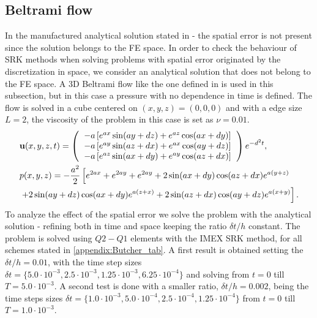 \subsection{Beltrami flow}
In the manufactured analytical solution stated in - the spatial error is not present since the solution belongs to the FE space. In order to check the behaviour of SRK methods when solving problems with spatial error originated by the discretization in space, we consider an analytical solution that does not belong to the FE space. A 3D Beltrami flow like the one defined in \cite{ethier_exact_1994} is used in this subsection, but in this case a pressure with no dependence in time is defined. The flow is solved in a cube centered on $(x,y,z)=(0,0,0)$ and with a edge size $L=2$, the viscosity of the problem in this case is set as $\nu=0.01$.
\begin{align}
\label{eq-C6_beltrami_u}
&\u(x,y,z,t) = \left( \begin{tabular}{l}
$-a\left[e^{ax}\sin(ay+dz)+e^{az}\cos(ax+dy)\right]$\\
$-a\left[e^{ay}\sin(az+dx)+e^{ax}\cos(ay+dz)\right]$\\
$-a\left[e^{az}\sin(ax+dy)+e^{ay}\cos(az+dx)\right]$
\end{tabular}\right)e^{-d^2t},\\
\label{eq-C6_beltrami_p}
&p(x,y,z) = -\frac{a^2}{2}\left[e^{2ax}+e^{2ay}+e^{2ay}+2\sin(ax+dy)\cos(az+dx)e^{a(y+z)}\right. \\\nonumber
&\left.+2\sin(ay+dz)\cos(ax+dy)e^{a(z+x)}+2\sin(az+dx)\cos(ay+dz)e^{a(x+y)}\right].
\end{align}
To analyze the effect of the spatial error we solve the problem with the analytical solution - refining both in time and space keeping the ratio $\delta t/h$ constant. The problem is solved using $Q2-Q1$ elements with the IMEX SRK method, for all schemes stated in \ref{appendix:Butcher_tab}. A first result is obtained setting the $\delta t/h=0.01$, with the time step sizes $\delta t=\{5.0\cdot10^{-3},2.5\cdot10^{-3},1.25\cdot10^{-3},6.25\cdot10^{-4}\}$ and solving from $t=0$ till $T=5.0\cdot10^{-3}$. A second test is done with a smaller ratio, $\delta t/h=0.002$, being the time steps sizes $\delta t=\{1.0\cdot10^{-3},5.0\cdot10^{-4},2.5\cdot10^{-4},1.25\cdot10^{-4}\}$ from $t=0$ till $T=1.0\cdot10^{-3}$.
